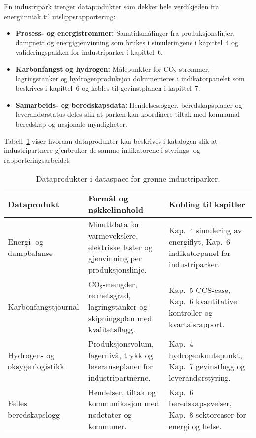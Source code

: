 En industripark trenger dataprodukter som dekker hele verdikjeden fra energiinntak til utslippsrapportering:
\begin{itemize}
    \item \textbf{Prosess- og energistrømmer:} Sanntidsmålinger fra produksjonslinjer, dampnett og energigjenvinning som brukes i simuleringene i kapittel~4 og valideringspakken for industriparker i kapittel~6.
    \item \textbf{Karbonfangst og hydrogen:} Målepunkter for CO$_2$-strømmer, lagringstanker og hydrogenproduksjon dokumenteres i indikatorpanelet som beskrives i kapittel~6 og kobles til gevinstplanen i kapittel~7.
    \item \textbf{Samarbeids- og beredskapsdata:} Hendelseslogger, beredskapsplaner og leverandørstatus deles slik at parken kan koordinere tiltak med kommunal beredskap og nasjonale myndigheter.
\end{itemize}

Tabell~\ref{tab:kap03-industripark} viser hvordan dataprodukter kan beskrives i katalogen slik at industripartnere gjenbruker de samme indikatorene i styrings- og rapporteringsarbeidet.

\begin{table}[ht]
    \centering
    \caption{Dataprodukter i dataspace for grønne industriparker.}
    \label{tab:kap03-industripark}
    \begin{tabular}{p{}p{}p{}}
        \toprule
        \textbf{Dataprodukt} & \textbf{Formål og nøkkelinnhold} & \textbf{Kobling til kapitler} \\
        \midrule
        Energi- og dampbalanse & Minuttdata for varmevekslere, elektriske laster og gjenvinning per produksjonslinje. & Kap.~4 simulering av energiflyt, Kap.~6 indikatorpanel for industriparker. \\
        Karbonfangstjournal & CO$_2$-mengder, renhetsgrad, lagringstanker og skipningsplan med kvalitetsflagg. & Kap.~5 CCS-case, Kap.~6 kvantitative kontroller og kvartalsrapport. \\
        Hydrogen- og oksygenlogistikk & Produksjonsvolum, lagernivå, trykk og leveranseplaner for industripartnerne. & Kap.~4 hydrogenknutepunkt, Kap.~7 gevinstlogg og leverandørstyring. \\
        Felles beredskapslogg & Hendelser, tiltak og kommunikasjon med nødetater og kommuner. & Kap.~6 beredskapsøvelser, Kap.~8 sektorcaser for energi og helse. \\
        \bottomrule
    \end{tabular}
\end{table}


